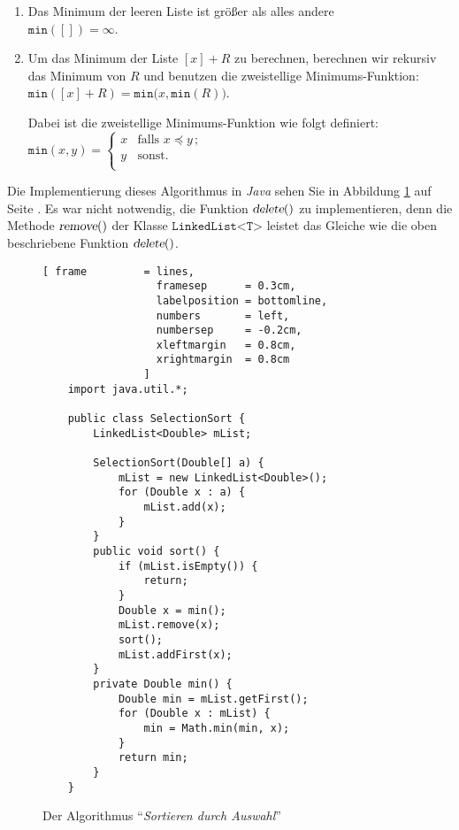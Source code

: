 \begin{enumerate}
\item Das Minimum der leeren Liste ist gr\"o\ss{}er als alles andere \\[0.1cm]
      \hspace*{1.3cm} $\mathtt{min}([]) = \infty$.
\item Um das Minimum der Liste $[x] + R$ zu berechnen, berechnen wir rekursiv das Minimum
      von $R$ und benutzen die zweistellige Minimums-Funktion: \\[0.1cm]
      \hspace*{1.3cm} 
      $\mathtt{min}([x] + R) = \mathtt{min}\bigl(x, \mathtt{min}(R) \bigr)$. 

      Dabei ist die zweistellige Minimums-Funktion wie folgt definiert: \\[0.1cm]
      \hspace*{1.3cm} 
      $\mathtt{min}(x,y) = \left\{
      \begin{array}{ll}
        x  & \mbox{falls $x \preceq y\,$;} \\
        y  & \mbox{sonst.} \\
      \end{array}\right.
      $
\end{enumerate}
Die Implementierung dieses Algorithmus in \textsl{Java} sehen Sie in Abbildung
\ref{fig:selection-sort} auf Seite \pageref{fig:selection-sort}.  Es war nicht notwendig,
die Funktion $\textsl{delete}()$ zu implementieren, denn die Methode $\textsl{remove}()$
der Klasse $\texttt{LinkedList<T>}$ leistet das Gleiche wie die oben beschriebene Funktion
$\textsl{delete}()$.

\begin{figure}[!ht]
  \centering
\begin{Verbatim}[ frame         = lines, 
                  framesep      = 0.3cm, 
                  labelposition = bottomline,
                  numbers       = left,
                  numbersep     = -0.2cm,
                  xleftmargin   = 0.8cm,
                  xrightmargin  = 0.8cm
                ]
    import java.util.*;
    
    public class SelectionSort {
        LinkedList<Double> mList;
        
        SelectionSort(Double[] a) {
            mList = new LinkedList<Double>();
            for (Double x : a) {
                mList.add(x);
            }
        }
        public void sort() {
            if (mList.isEmpty()) {
                return;
            }
            Double x = min();
            mList.remove(x);
            sort();
            mList.addFirst(x);
        }    
        private Double min() {
            Double min = mList.getFirst();
            for (Double x : mList) {
                min = Math.min(min, x);
            }
            return min;
        }
    }
\end{Verbatim}
\vspace*{-0.3cm}
  \caption{Der Algorithmus ``\emph{Sortieren durch Auswahl}''}
  \label{fig:selection-sort}
\end{figure}

